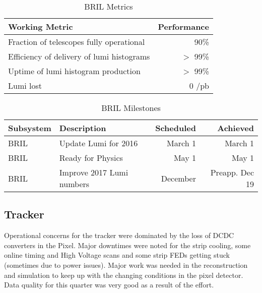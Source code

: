 \documentclass[12pt]{article}
\begin{document}
\begin{table}[htp]
\caption{BRIL Metrics}
\begin{center}
\begin{tabular}{|l|r|}
\hline
Working Metric&Performance\\
\hline
Fraction of telescopes fully operational &  90\% \\
\hline
Efficiency of delivery of lumi histograms &  $>$ 99\% \\
\hline
Uptime of lumi  histogram production & $>$ 99\% \\
\hline
Lumi lost & 0 /pb \\
\hline
\end{tabular}
\end{center}
\label{BRILMetrics}
\end{table}%


\begin{table}[htp]
\caption{BRIL Milestones}
\begin{center}
\begin{tabular}{|l|l|r|r|}
\hline
Subsystem&Description&Scheduled&Achieved\\
\hline
BRIL & Update Lumi for 2016
& March 1& March 1\\
\hline
BRIL& Ready for Physics & May 1& May 1   \\
\hline
BRIL & Improve 2017 Lumi numbers & December  &  Preapp. Dec 19\\
\hline
\end{tabular}
\end{center}
\label{BRILMIlestones}
\end{table}%



\subsection{Tracker }

Operational concerns for the tracker were dominated by the 
loss of DCDC converters in the Pixel. Major downtimes were
noted for the strip cooling, some online timing and High 
Voltage scans and some strip FEDs getting stuck (sometimes
due to power issues). Major work was needed in the reconstruction
and simulation to keep up with the changing conditions in
the pixel detector. Data quality for this quarter was very
good as a result of the effort.
\end{document}
